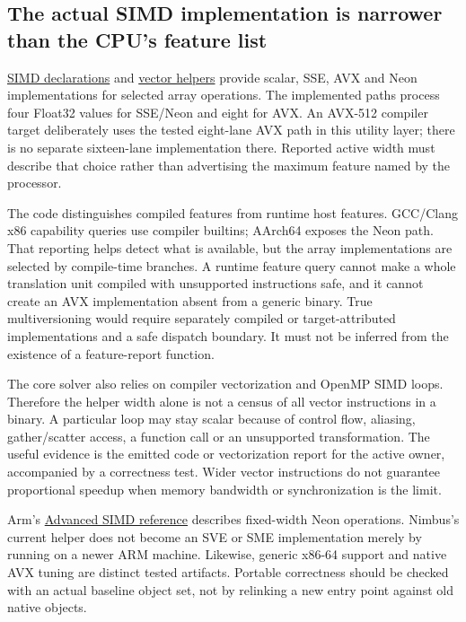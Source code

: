 \subsection{The actual SIMD implementation is narrower than the CPU's feature list}

\href{../include/util/simd_utils.hpp}{SIMD declarations} and
\href{../src/core/infra/simd_utils.cpp}{vector helpers} provide scalar, SSE,
AVX and Neon implementations for selected array operations. The implemented
paths process four Float32 values for SSE/Neon and eight for AVX. An AVX-512
compiler target deliberately uses the tested eight-lane AVX path in this
utility layer; there is no separate sixteen-lane implementation there.
Reported active width must describe that choice rather than advertising the
maximum feature named by the processor.

The code distinguishes compiled features from runtime host features. GCC/Clang
x86 capability queries use compiler builtins; AArch64 exposes the Neon path.
That reporting helps detect what is available, but the array implementations
are selected by compile-time branches. A runtime feature query cannot make a
whole translation unit compiled with unsupported instructions safe, and it
cannot create an AVX implementation absent from a generic binary. True
multiversioning would require separately compiled or target-attributed
implementations and a safe dispatch boundary. It must not be inferred from
the existence of a feature-report function.

The core solver also relies on compiler vectorization and OpenMP SIMD loops.
Therefore the helper width alone is not a census of all vector instructions in
a binary. A particular loop may stay scalar because of control flow, aliasing,
gather/scatter access, a function call or an unsupported transformation. The
useful evidence is the emitted code or vectorization report for the active
owner, accompanied by a correctness test. Wider vector instructions do not
guarantee proportional speedup when memory bandwidth or synchronization is
the limit.

Arm's \href{https://developer.arm.com/documentation/101028/0009/Advanced-SIMD--Neon--intrinsics}{Advanced SIMD reference}
describes fixed-width Neon operations. Nimbus's current helper does not become
an SVE or SME implementation merely by running on a newer ARM machine.
Likewise, generic x86-64 support and native AVX tuning are distinct tested
artifacts. Portable correctness should be checked with an actual baseline
object set, not by relinking a new entry point against old native objects.

